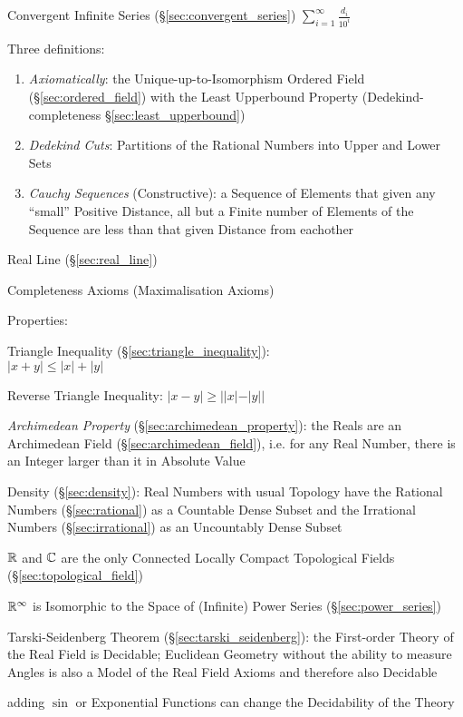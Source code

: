 Convergent Infinite Series (\S\ref{sec:convergent_series}) $\sum_{i =
  1}^{\infty} \frac{d_i}{10^i}$

Three definitions:
\begin{enumerate}
  \item \emph{Axiomatically}: the Unique-up-to-Isomorphism Ordered Field
    (\S\ref{sec:ordered_field}) with the Least Upperbound Property
    (Dedekind-completeness \S\ref{sec:least_upperbound})
  \item \emph{Dedekind Cuts}: Partitions of the Rational Numbers into
    Upper and Lower Sets
  \item \emph{Cauchy Sequences} (Constructive): a Sequence of Elements that
    given any ``small'' Positive Distance, all but a Finite number of Elements
    of the Sequence are less than that given Distance from eachother
\end{enumerate}

Real Line (\S\ref{sec:real_line})

Completeness Axioms (Maximalisation Axioms)

Properties:

Triangle Inequality (\S\ref{sec:triangle_inequality}):\\
$|x + y| \leq |x| + |y|$

Reverse Triangle Inequality: $|x - y| \geq ||x| - |y||$

\emph{Archimedean Property} (\S\ref{sec:archimedean_property}): the Reals are
an Archimedean Field (\S\ref{sec:archimedean_field}), i.e. for any Real Number,
there is an Integer larger than it in Absolute Value

Density (\S\ref{sec:density}): Real Numbers with usual Topology have the
Rational Numbers (\S\ref{sec:rational}) as a Countable Dense Subset and the
Irrational Numbers (\S\ref{sec:irrational}) as an Uncountably Dense Subset

$\mathbb{R}$ and $\mathbb{C}$ are the only Connected Locally Compact
Topological Fields (\S\ref{sec:topological_field})

$\mathbb{R}^\infty$ is Isomorphic to the Space of (Infinite) Power Series
(\S\ref{sec:power_series})

Tarski-Seidenberg Theorem (\S\ref{sec:tarski_seidenberg}): the First-order
Theory of the Real Field is Decidable; Euclidean Geometry without the ability
to measure Angles is also a Model of the Real Field Axioms and therefore also
Decidable

adding $\sin$ or Exponential Functions can change the Decidability of the Theory

